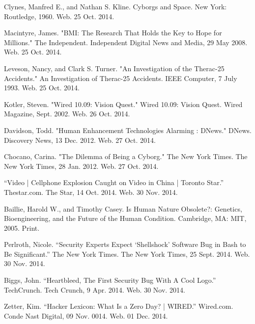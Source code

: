 \documentclass[12pt,a4paper,notitlepage]{article}
\begin{document}
\newpage
\begin{thebibliography}{9}

 Clynes, Manfred E., and Nathan S. Kline. Cyborgs and Space. New
	York: Routledge, 1960. Web. 25 Oct. 2014.

 Macintyre, James. "BMI: The Research That Holds the Key to
	Hope for Millions." The Independent. Independent Digital News and Media, 29
	May 2008. Web. 25 Oct. 2014.

 Leveson, Nancy, and Clark S. Turner. "An Investigation of the
	Therac-25 Accidents." An Investigation of Therac-25 Accidents. IEEE
	Computer, 7 July 1993. Web. 25 Oct. 2014.

 Kotler, Steven. "Wired 10.09: Vision Quest." Wired 10.09: Vision
	Quest. Wired Magazine, Sept. 2002. Web. 26 Oct. 2014.

 Davidson, Todd. "Human Enhancement Technologies Alarming :
	DNews." DNews. Discovery News, 13 Dec. 2012. Web. 27 Oct. 2014.

 Chocano, Carina. "The Dilemma of Being a Cyborg." The New York
	Times. The New York Times, 28 Jan. 2012. Web. 27 Oct. 2014.

 ``Video | Cellphone Explosion Caught on Video in
	China | Toronto Star.'' Thestar.com. The Star, 14 Oct. 2014. Web. 30 Nov.
	2014.

 Baillie, Harold W., and Timothy Casey. Is Human Nature
	Obsolete?: Genetics, Bioengineering, and the Future of the Human Condition.
	Cambridge, MA: MIT, 2005.  Print.

 Perlroth, Nicole. ``Security Experts Expect ‘Shellshock’
	Software Bug in Bash to Be Significant.'' The New York Times. The New York
	Times, 25 Sept. 2014. Web. 30 Nov. 2014.

 Biggs, John. ``Heartbleed, The First Security Bug With A
	Cool Logo.'' TechCrunch. Tech Crunch, 9 Apr. 2014. Web. 30 Nov. 2014.

Zetter, Kim. ``Hacker Lexicon: What Is a Zero Day? | WIRED.''
	Wired.com. Conde Nast Digital, 09 Nov. 0014. Web. 01 Dec. 2014.

\end{thebibliography}
\end{document}

